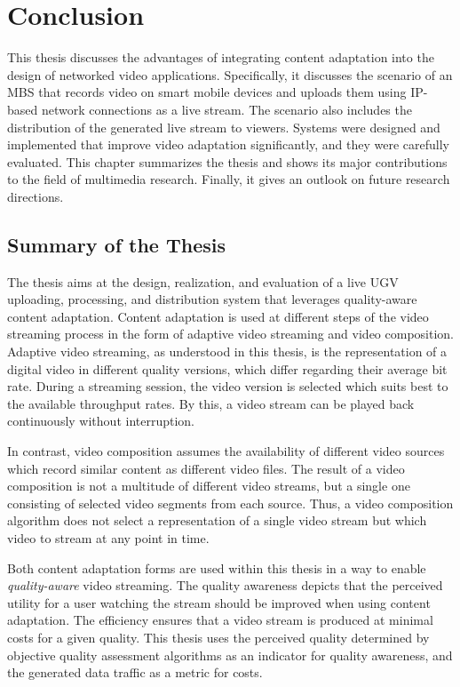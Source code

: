 \acresetall
\chapter{Conclusion}\label{ch:conclusion}
This thesis discusses the advantages of integrating content adaptation into the design of networked video applications.
Specifically, it discusses the scenario of an \acf{MBS} that records video on smart mobile devices and uploads them using \ac{IP}-based network connections as a live stream.
The scenario also includes the distribution of the generated live stream to viewers.
Systems were designed and implemented that improve video adaptation significantly, and they were carefully evaluated.
This chapter summarizes the thesis and shows its major contributions to the field of multimedia research.
Finally, it gives an outlook on future research directions.
\section{Summary of the Thesis}
The thesis aims at the design, realization, and evaluation of a live \ac{UGV} uploading, processing, and distribution system that leverages quality-aware content adaptation.
Content adaptation is used at different steps of the video streaming process in the form of adaptive video streaming and video composition.
Adaptive video streaming, as understood in this thesis, is the representation of a digital video in different quality versions, which differ regarding their average bit rate.
During a streaming session, the video version is selected which suits best to the available throughput rates.
By this, a video stream can be played back continuously without interruption.

In contrast, video composition assumes the availability of different video sources which record similar content as different video files.
The result of a video composition is not a multitude of different video streams, but a single one consisting of selected video segments from each source.
Thus, a video composition algorithm does not select a representation of a single video stream but which video to stream at any point in time.

Both content adaptation forms are used within this thesis in a way to enable \emph{quality-aware} video streaming.
The quality awareness depicts that the perceived utility for a user watching the stream should be improved when using content adaptation.
The efficiency ensures that a video stream is produced at minimal costs for a given quality.
This thesis uses the perceived quality determined by objective quality assessment algorithms as an indicator for quality awareness, and the generated data traffic as a metric for costs.

